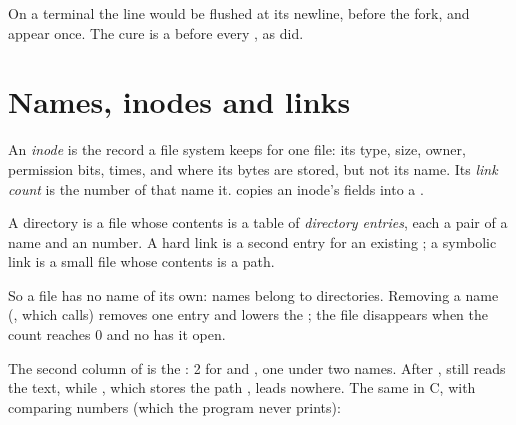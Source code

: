 On a terminal the line would be flushed at its newline, before the fork, and appear once. The cure is a
 before every , as  did.

\section{Names, inodes and links}\label{sec:b2:files-pipes-signals:inodes}

\begin{definition}\label{def:b2:files-pipes-signals:inode}
An \emph{inode} is the record a file system keeps for one file: its type, size, owner, permission bits,
times, and where its bytes are stored, but not its name. Its \emph{link count} is the number of
 that name it.  copies an inode's fields into a .
\end{definition}

\begin{definition}\label{def:b2:files-pipes-signals:dirent}
A directory is a file whose contents is a table of \emph{directory entries}, each a pair of a
name and an  number. A hard link is a second entry for an existing ; a symbolic link is a small file whose
contents is a path.
\end{definition}

So a file has no name of its own: names belong to directories. Removing a name (, which  calls)
removes one entry and lowers the ; the file disappears when the count reaches 0 and no  has it
open.

\label{out:b2:files-pipes-signals:links}

The second column of  is the : 2 for  and , one  under
two names. After ,  still reads the text, while , which
stores the path , leads nowhere. The same in C, with  comparing  numbers (which the
program never prints):

